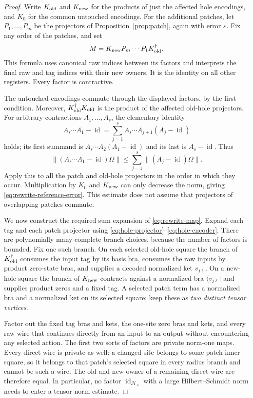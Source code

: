 \documentclass[11pt]{article}
\numberwithin{equation}{section}
\theoremstyle{definition}
\theoremstyle{remark}
\begin{document}
\begin{proof}
Write $K_{\rm old}$ and $K_{\rm new}$ for the products of just the affected
hole encodings, and $K_0$ for the common untouched encodings.  For the
additional patches, let $P_1,\ldots,P_m$ be the projectors of
Proposition~\ref{prop:patch}, again with error $\varepsilon$.  Fix any order
of the patches, and set
\begin{equation}\label{eq:rewrite-map}
 M=K_{\rm new}P_m\cdots P_1K_{\rm old}^{\dagger}.
\end{equation}
This formula uses canonical raw indices between its factors and interprets
the final raw and tag indices with their new owners.  It is the identity on
all other registers.  Every factor is contractive.

The untouched encodings commute through the displayed factors, by the
first condition.  Moreover,
$K_{\rm old}^{\dagger}K_{\rm old}$ is the product of the affected old-hole
projectors.  For arbitrary contractions $A_1,\ldots,A_s$, the elementary
identity
\[
 A_s\cdots A_1-\operatorname{id}
  =\sum_{j=1}^s A_s\cdots A_{j+1}(A_j-\operatorname{id})
\]
holds; its first summand is $A_s\cdots A_2(A_1-\operatorname{id})$ and its last is
$A_s-\operatorname{id}$.  Thus
\[
 \lVert (A_s\cdots A_1-\operatorname{id})\Omega\rVert
      \le\sum_{j=1}^s\lVert (A_j-\operatorname{id})\Omega\rVert.
\]
Apply this to all the patch and old-hole projectors in the order in which
they occur.  Multiplication by $K_0$ and $K_{\rm new}$ can only decrease
the norm, giving \eqref{eq:rewrite-reference-error}.  This estimate does not
assume that projectors of overlapping patches commute.

We now construct the required sum expansion of \eqref{eq:rewrite-map}.
Expand each tag and each patch projector using
\eqref{eq:hole-projector}--\eqref{eq:hole-encoder}.  There are polynomially
many complete branch choices, because the number of factors is bounded.
Fix one such branch.  On each selected old-hole square the branch of
$K_{\rm old}^{\dagger}$ consumes the input tag by its basis bra, consumes
the raw inputs by product zero-state bras, and supplies a decoded normalized
ket $v_{j\ell}$.  On a new-hole square the branch of $K_{\rm new}$ contracts
against a normalized bra $\langle v_{j\ell}|$ and supplies product zeros
and a fixed tag.  A selected patch term has a normalized bra and a
normalized ket on its selected square; keep these as \emph{two distinct
tensor vertices}.

Factor out the fixed tag bras and kets, the one-site zero bras and kets, and
every raw wire that continues directly from an input to an output without
encountering any selected action.  The first two sorts of factors are
private norm-one maps.  Every direct wire is private as well: a changed
site belongs to some patch inner square, so it belongs to that patch's
selected square in every radius branch and cannot be such a wire.  The
old and new owner of a remaining direct wire are therefore equal.  In
particular, no factor $\operatorname{id}_{\mathcal H_A}$ with a large Hilbert--Schmidt
norm needs to enter a tensor norm estimate.


\end{proof}
\end{document}
